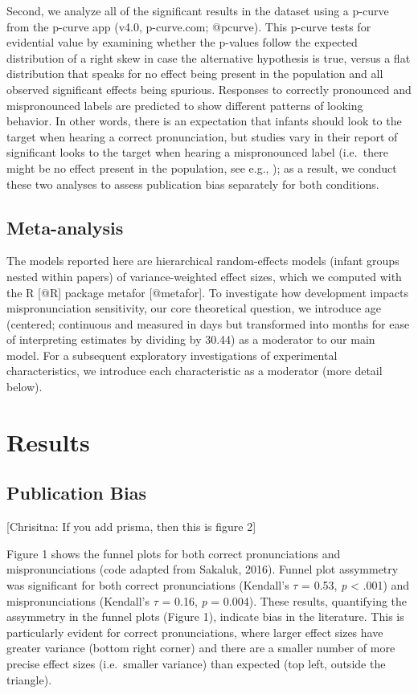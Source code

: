 \documentclass[man]{apa6}
\theoremstyle{definition}
\theoremstyle{definition}
\theoremstyle{definition}
\theoremstyle{remark}
\begin{document}
Second, we analyze all of the significant results in the dataset using a
p-curve from the p-curve app (v4.0, p-curve.com; @pcurve). This p-curve
tests for evidential value by examining whether the p-values follow the
expected distribution of a right skew in case the alternative hypothesis
is true, versus a flat distribution that speaks for no effect being
present in the population and all observed significant effects being
spurious. Responses to correctly pronounced and mispronounced labels are
predicted to show different patterns of looking behavior. In other
words, there is an expectation that infants should look to the target
when hearing a correct pronunciation, but studies vary in their report
of significant looks to the target when hearing a mispronounced label
(i.e.~there might be no effect present in the population, see e.g., );
as a result, we conduct these two analyses to assess publication bias
separately for both conditions.

\subsection{Meta-analysis}\label{meta-analysis}

The models reported here are hierarchical random-effects models (infant
groups nested within papers) of variance-weighted effect sizes, which we
computed with the R {[}@R{]} package metafor {[}@metafor{]}. To
investigate how development impacts mispronunciation sensitivity, our
core theoretical question, we introduce age (centered; continuous and
measured in days but transformed into months for ease of interpreting
estimates by dividing by 30.44) as a moderator to our main model. For a
subsequent exploratory investigations of experimental characteristics,
we introduce each characteristic as a moderator (more detail below).

\section{Results}\label{results}

\subsection{Publication Bias}\label{publication-bias-1}

{[}Chrisitna: If you add prisma, then this is figure 2{]}

Figure 1 shows the funnel plots for both correct pronunciations and
mispronunciations (code adapted from Sakaluk, 2016). Funnel plot
assymmetry was significant for both correct pronunciations (Kendall's
\(\tau\) = 0.53, \emph{p} \textless{} .001) and mispronunciations
(Kendall's \(\tau\) = 0.16, \emph{p} = 0.004). These results,
quantifying the assymmetry in the funnel plots (Figure 1), indicate bias
in the literature. This is particularly evident for correct
pronunciations, where larger effect sizes have greater variance (bottom
right corner) and there are a smaller number of more precise effect
sizes (i.e.~smaller variance) than expected (top left, outside the
triangle).
\end{document}
